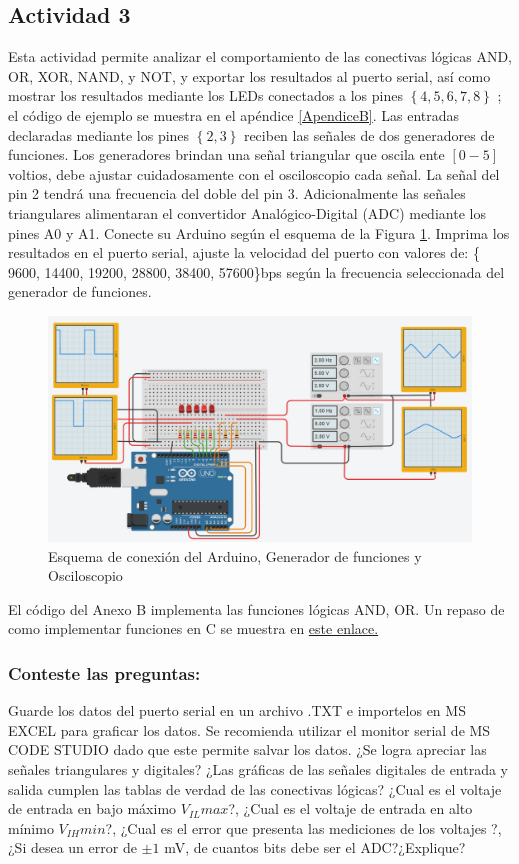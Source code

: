 \subsection{Actividad 3}

Esta actividad permite analizar el comportamiento de las conectivas lógicas  AND, OR, XOR, NAND, y NOT, y exportar los resultados al puerto serial, así como mostrar los resultados mediante los LEDs conectados a los pines $\left\lbrace4, 5, 6, 7, 8 \right\rbrace$ ; el código de ejemplo se muestra en el apéndice \ref{ApendiceB}. Las entradas declaradas mediante los pines $\left\lbrace2, 3 \right\rbrace$ reciben las señales de dos generadores de funciones. Los generadores brindan una señal triangular que oscila ente $[0-5]$ voltios, debe ajustar cuidadosamente con el osciloscopio cada señal. La señal del pin 2 tendrá una frecuencia del doble del pin 3. Adicionalmente las señales  triangulares alimentaran el convertidor Analógico-Digital (ADC) mediante los pines A0 y A1. Conecte su Arduino según el esquema de la Figura \ref{fig:fig2}.  Imprima los resultados en el puerto serial, ajuste la velocidad del puerto con valores de: \{ 9600, 14400, 19200, 28800, 38400, 57600\}bps según la frecuencia seleccionada del generador de funciones.

\begin{figure}[H]
	\centering
	\includegraphics[width=0.8\linewidth]{fig/Fig2.png}
	\caption{Esquema de conexión del Arduino, Generador de funciones y Osciloscopio}
	\label{fig:fig2}
\end{figure}


El código del Anexo B implementa las funciones lógicas AND, OR. Un repaso de como implementar funciones en C se muestra en \href{https://aprendiendoarduino.wordpress.com/2016/11/16/funciones-definidas-por-usuario-2/}{este enlace.} 

\subsubsection{Conteste las preguntas:}

Guarde los datos del puerto serial en un archivo .TXT e importelos en MS EXCEL para graficar los datos.
Se recomienda utilizar el monitor serial de MS CODE STUDIO dado que este permite salvar los datos.
¿Se logra apreciar las señales triangulares y digitales?
¿Las gráficas de las señales digitales de entrada y salida cumplen las tablas de verdad de las conectivas lógicas?
¿Cual es el voltaje de entrada en bajo máximo $V_{IL} max$?,
¿Cual es el voltaje de entrada en alto mínimo $V_{IH} min$?,
¿Cual es el error que presenta las mediciones de los voltajes ?,
¿Si desea un error de $\pm1$ mV, de cuantos bits debe ser el ADC?¿Explique?